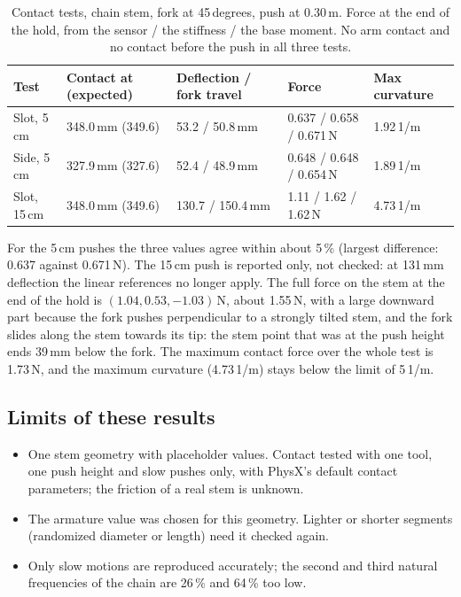 \documentclass[11pt,a4paper]{article}
\begin{document}
\begin{table}[h]
  \centering
  \caption{Contact tests, chain stem, fork at 45\,degrees, push at 0.30\,m. Force at the end of the hold, from
           the sensor / the stiffness / the base moment. No arm contact and no contact before the push in all
           three tests.}
  \label{tab:contact}
  \begin{tabular}{lllll}
    \toprule
    Test & Contact at (expected) & Deflection / fork travel & Force & Max curvature \\
    \midrule
    Slot, 5\,cm  & 348.0\,mm (349.6) & 53.2 / 50.8\,mm   & 0.637 / 0.658 / 0.671\,N & 1.92\,1/m \\
    Side, 5\,cm  & 327.9\,mm (327.6) & 52.4 / 48.9\,mm   & 0.648 / 0.648 / 0.654\,N & 1.89\,1/m \\
    Slot, 15\,cm & 348.0\,mm (349.6) & 130.7 / 150.4\,mm & 1.11 / 1.62 / 1.62\,N    & 4.73\,1/m \\
    \bottomrule
  \end{tabular}
\end{table}

For the 5\,cm pushes the three values agree within about 5\,\% (largest difference: 0.637 against 0.671\,N).
The 15\,cm push is reported only, not checked: at 131\,mm deflection the linear references no longer apply.
The full force on the stem at the end of the hold is $(1.04, 0.53, -1.03)$\,N, about 1.55\,N, with a large
downward part because the fork pushes perpendicular to a strongly tilted stem, and the fork slides along the
stem towards its tip: the stem point that was at the push height ends 39\,mm below the fork. The maximum
contact force over the whole test is 1.73\,N, and the maximum curvature (4.73\,1/m) stays below the limit of
5\,1/m.

\subsection{Limits of these results}

\begin{itemize}
  \item One stem geometry with placeholder values. Contact tested with one tool, one push height and slow
        pushes only, with PhysX's default contact parameters; the friction of a real stem is unknown.
  \item The armature value was chosen for this geometry. Lighter or shorter segments (randomized diameter or
        length) need it checked again.
  \item Only slow motions are reproduced accurately; the second and third natural frequencies of the chain are
        26\,\% and 64\,\% too low.
\end{itemize}
\end{document}
